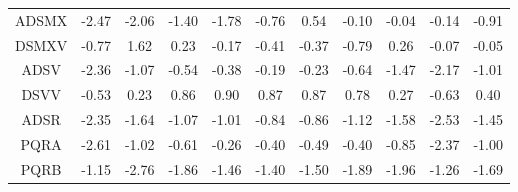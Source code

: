 \documentclass[11pt,a4paper]{report}
\begin{document}
\begin{longtable}{ | c || c | c | c | c | c | c | c | c | c || c |}
ADSMX &  \cellcolor[HTML]{FFBFBF} -2.47 &  \cellcolor[HTML]{FFCFCF} -2.06 &  \cellcolor[HTML]{FFDFDF} -1.40 &  \cellcolor[HTML]{FFCFCF} -1.78 &  \cellcolor[HTML]{FFEFEF} -0.76 &  \cellcolor[HTML]{EFEFFF} 0.54 &  \cellcolor[HTML]{FFFFFF} -0.10 &  \cellcolor[HTML]{FFFFFF} -0.04 &  \cellcolor[HTML]{FFFFFF} -0.14 &  \cellcolor[HTML]{FFE7E7} -0.91 \\
DSMXV &  \cellcolor[HTML]{FFEFEF} -0.77 &  \cellcolor[HTML]{D7D7FF} 1.62 &  \cellcolor[HTML]{F7F7FF} 0.23 &  \cellcolor[HTML]{FFF7F7} -0.17 &  \cellcolor[HTML]{FFF7F7} -0.41 &  \cellcolor[HTML]{FFF7F7} -0.37 &  \cellcolor[HTML]{FFEFEF} -0.79 &  \cellcolor[HTML]{F7F7FF} 0.26 &  \cellcolor[HTML]{FFFFFF} -0.07 &  \cellcolor[HTML]{FFFFFF} -0.05 \\
ADSV &  \cellcolor[HTML]{FFC7C7} -2.36 &  \cellcolor[HTML]{FFE7E7} -1.07 &  \cellcolor[HTML]{FFEFEF} -0.54 &  \cellcolor[HTML]{FFF7F7} -0.38 &  \cellcolor[HTML]{FFF7F7} -0.19 &  \cellcolor[HTML]{FFF7F7} -0.23 &  \cellcolor[HTML]{FFEFEF} -0.64 &  \cellcolor[HTML]{FFD7D7} -1.47 &  \cellcolor[HTML]{FFC7C7} -2.17 &  \cellcolor[HTML]{FFE7E7} -1.01 \\
DSVV &  \cellcolor[HTML]{FFEFEF} -0.53 &  \cellcolor[HTML]{F7F7FF} 0.23 &  \cellcolor[HTML]{E7E7FF} 0.86 &  \cellcolor[HTML]{E7E7FF} 0.90 &  \cellcolor[HTML]{E7E7FF} 0.87 &  \cellcolor[HTML]{E7E7FF} 0.87 &  \cellcolor[HTML]{EFEFFF} 0.78 &  \cellcolor[HTML]{F7F7FF} 0.27 &  \cellcolor[HTML]{FFEFEF} -0.63 &  \cellcolor[HTML]{F7F7FF} 0.40 \\
ADSR &  \cellcolor[HTML]{FFC7C7} -2.35 &  \cellcolor[HTML]{FFD7D7} -1.64 &  \cellcolor[HTML]{FFE7E7} -1.07 &  \cellcolor[HTML]{FFE7E7} -1.01 &  \cellcolor[HTML]{FFE7E7} -0.84 &  \cellcolor[HTML]{FFE7E7} -0.86 &  \cellcolor[HTML]{FFDFDF} -1.12 &  \cellcolor[HTML]{FFD7D7} -1.58 &  \cellcolor[HTML]{FFBFBF} -2.53 &  \cellcolor[HTML]{FFD7D7} -1.45 \\
PQRA &  \cellcolor[HTML]{FFBFBF} -2.61 &  \cellcolor[HTML]{FFE7E7} -1.02 &  \cellcolor[HTML]{FFEFEF} -0.61 &  \cellcolor[HTML]{FFF7F7} -0.26 &  \cellcolor[HTML]{FFF7F7} -0.40 &  \cellcolor[HTML]{FFEFEF} -0.49 &  \cellcolor[HTML]{FFF7F7} -0.40 &  \cellcolor[HTML]{FFE7E7} -0.85 &  \cellcolor[HTML]{FFC7C7} -2.37 &  \cellcolor[HTML]{FFE7E7} -1.00 \\
PQRB &  \cellcolor[HTML]{FFDFDF} -1.15 &  \cellcolor[HTML]{FFB7B7} -2.76 &  \cellcolor[HTML]{FFCFCF} -1.86 &  \cellcolor[HTML]{FFD7D7} -1.46 &  \cellcolor[HTML]{FFDFDF} -1.40 &  \cellcolor[HTML]{FFD7D7} -1.50 &  \cellcolor[HTML]{FFCFCF} -1.89 &  \cellcolor[HTML]{FFCFCF} -1.96 &  \cellcolor[HTML]{FFDFDF} -1.26 &  \cellcolor[HTML]{FFD7D7} -1.69 \\

\end{longtable}
\end{document}
